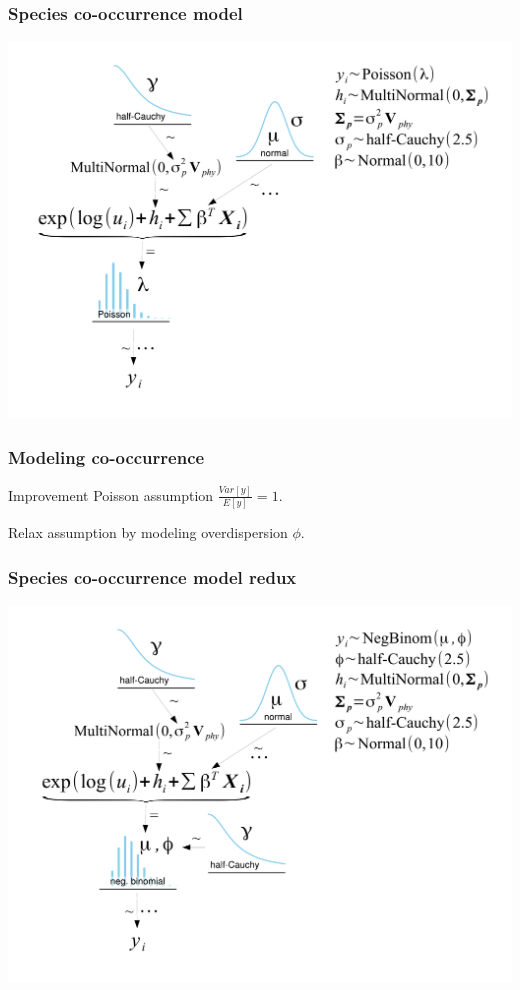 \documentclass{beamer}
\begin{document}
\begin{frame}
  \frametitle{Species co-occurrence model}
  \begin{center}
    \includegraphics[height = 0.8\textheight, width = \textwidth,  keepaspectratio = true]{figure/mammal_degree_model}
  \end{center}
\end{frame}

\begin{frame}
  \frametitle{Modeling co-occurrence}
  \begin{block}{Improvement}
    Poisson assumption \(\frac{Var[y]}{E[y]} = 1\).

    Relax assumption by modeling overdispersion \(\phi\).
  \end{block}
\end{frame}

\begin{frame}
  \frametitle{Species co-occurrence model redux}
  \begin{center}
    \includegraphics[height = 0.8\textheight, width = \textwidth,  keepaspectratio = true]{figure/mammal_deg_over_model}
  \end{center}
\end{frame}
\end{document}
